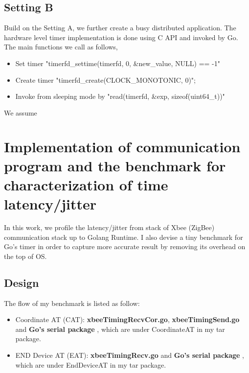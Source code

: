 \documentclass[a4paper,12pt]{article}
\theoremstyle{mytheor}
\begin{document}
\subsection{Setting B}
Build on the Setting A, we further create a busy distributed application.  
The hardware level timer implementation is done using C API \cite{fang} \cite{libcgo} and invoked by Go. The main functions we call as follows,
\begin{itemize}
\item  Set timer "timerfd\_settime(timerfd, 0, \&new\_value, NULL) == -1"
\item  Create timer "timerfd\_create(CLOCK\_MONOTONIC, 0)"; 
\item  Invoke from sleeping mode by "read(timerfd, \&exp, sizeof(uint64\_t))"
\end{itemize}

We assume 



\section{Implementation of communication program and the benchmark for characterization of time latency/jitter} 

In this work, we profile the latency/jitter from stack of Xbee (ZigBee) communication stack up to Golang Runtime. I also devise a tiny benchmark for Go's timer in order to capture more accurate result by removing its overhead on the top of OS.

\subsection{Design} 

The flow of my benchmark is listed as follow:
\vspace{-0.1in}
\begin{itemize} 
\item Coordinate AT (CAT): {\bf xbeeTimingRecvCor.go}, {\bf xbeeTimingSend.go} and {\bf Go's serial package} \cite{goserial}, which are under CoordinateAT in my tar package. 
\item END Device AT (EAT): {\bf xbeeTimingRecv.go} and {\bf Go's serial package} \cite{goserial}, which are under EndDeviceAT in my tar package. 
\end{itemize} 
\vspace{0.1in}
\end{document}
